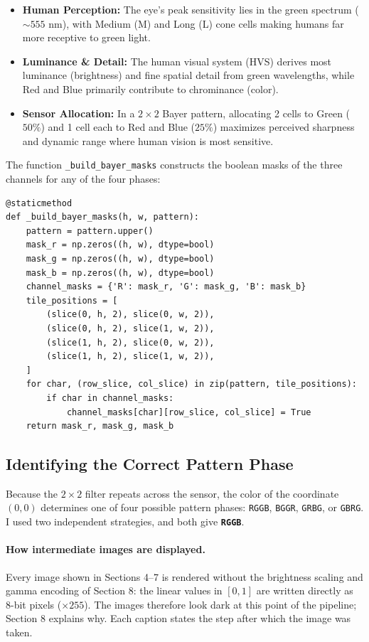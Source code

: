 \documentclass[a4paper]{article}
\begin{document}
\begin{itemize}
    \item \textbf{Human Perception:} The eye's peak sensitivity lies in the green spectrum ($\sim 555\text{ nm}$), with Medium (M) and Long (L) cone cells making humans far more receptive to green light.
    \item \textbf{Luminance \& Detail:} The human visual system (HVS) derives most luminance (brightness) and fine spatial detail from green wavelengths, while Red and Blue primarily contribute to chrominance (color).
    \item \textbf{Sensor Allocation:} In a $2 \times 2$ Bayer pattern, allocating 2 cells to Green ($50\%$) and 1 cell each to Red and Blue ($25\%$) maximizes perceived sharpness and dynamic range where human vision is most sensitive.
\end{itemize}

The function \texttt{\_build\_bayer\_masks} constructs the boolean masks of the three channels for any of the four phases:
\begin{lstlisting}
@staticmethod
def _build_bayer_masks(h, w, pattern):
    pattern = pattern.upper()
    mask_r = np.zeros((h, w), dtype=bool)
    mask_g = np.zeros((h, w), dtype=bool)
    mask_b = np.zeros((h, w), dtype=bool)
    channel_masks = {'R': mask_r, 'G': mask_g, 'B': mask_b}
    tile_positions = [
        (slice(0, h, 2), slice(0, w, 2)),
        (slice(0, h, 2), slice(1, w, 2)),
        (slice(1, h, 2), slice(0, w, 2)),
        (slice(1, h, 2), slice(1, w, 2)),
    ]
    for char, (row_slice, col_slice) in zip(pattern, tile_positions):
        if char in channel_masks:
            channel_masks[char][row_slice, col_slice] = True
    return mask_r, mask_g, mask_b
\end{lstlisting}

\subsection{Identifying the Correct Pattern Phase}
\label{sec:phase}
Because the $2 \times 2$ filter repeats across the sensor, the color of the coordinate $(0, 0)$ determines one of four possible pattern phases: \texttt{RGGB}, \texttt{BGGR}, \texttt{GRBG}, or \texttt{GBRG}. I used two independent strategies, and both give \textbf{\texttt{RGGB}}.

\paragraph{How intermediate images are displayed.} Every image shown in Sections 4--7 is rendered without the brightness scaling and gamma encoding of Section 8: the linear values in $[0, 1]$ are written directly as 8-bit pixels ($\times 255$). The images therefore look dark at this point of the pipeline; Section 8 explains why. Each caption states the step after which the image was taken.
\end{document}
